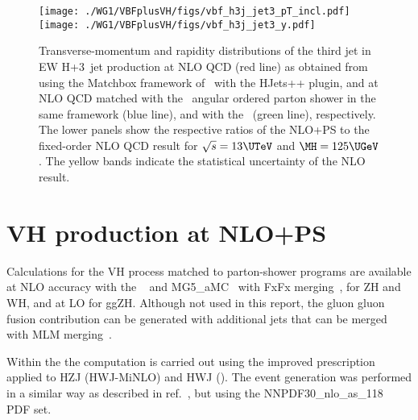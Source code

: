 %
\begin{figure}
\texttt{[image: ./WG1/VBFplusVH/figs/vbf\_h3j\_jet3\_pT\_incl.pdf]}
\hfill
\texttt{[image: ./WG1/VBFplusVH/figs/vbf\_h3j\_jet3\_y.pdf]}
\caption{Transverse-momentum and rapidity distributions of the third jet in EW H+3~jet production at NLO QCD (red line)  as obtained from using the \textsf{Matchbox} framework 
of \ with the \textsf{HJets++} plugin, and at NLO QCD matched with the 
\ angular ordered parton shower in the same framework (blue line), 
and with the \POWHEGBOX\ (green line), respectively. The lower panels show the respective ratios of the NLO+PS to the fixed-order NLO QCD result for $\sqrt{s}=13\UTeV$ and $\MH=125\UGeV$. The yellow bands indicate the statistical uncertainty of the NLO result. }
\label{fig:SM-VBF-H3j-jet3}
\end{figure}
%


\clearpage
\section{VH production at NLO+PS}
%
Calculations for the VH process matched to parton-shower programs are
available at NLO accuracy with the \POWHEGBOX~\cite{Luisoni:2013kna} and
{\sc MG5\_aMC}~\cite{Alwall:2014hca} with FxFx
merging~\cite{Frederix:2012ps,Frederix:2015eii}, for ZH and WH, and at
LO for ggZH. Although not used in this report, the gluon gluon fusion contribution 
can be generated with additional jets that can be merged with MLM merging~\cite{Hespel:2015zea}.
%

Within the \POWHEGBOX{} the computation is carried out using the
improved \MINLO{} prescription~\cite{Hamilton:2012rf} applied to {\sc
  HZJ} ({\sc HWJ-MiNLO}) and {\sc HWJ} (\HWJMINLO). The event
generation was performed in a similar way as described in
ref.~\cite{Luisoni:2013kna}, but using the
NNPDF30\_nlo\_as\_118~\cite{Ball:2014uwa} PDF set.


